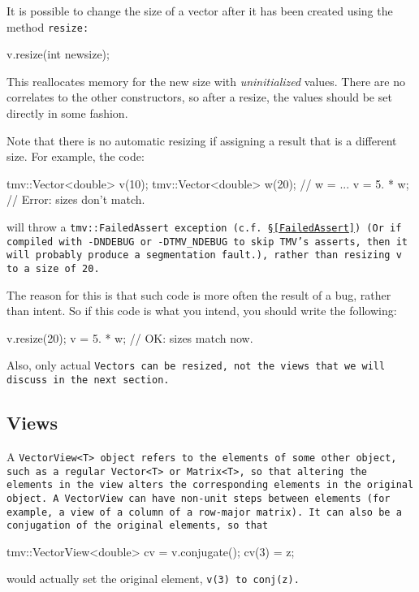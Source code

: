 It is possible to change the size of a vector after it has been created using the method \tt{resize}:

\begin{tmvcode}
v.resize(int newsize);
\end{tmvcode}
This reallocates memory for the new size with {\em uninitialized} values.  
There are no correlates to the other constructors, so after a resize, the 
values should be set directly in some fashion.

Note that there is no automatic resizing if assigning a result that is a different size. 
For example, the code:
\begin{tmvcode}
tmv::Vector<double> v(10);
tmv::Vector<double> w(20);
// w = ...
v = 5. * w;  // Error: sizes don't match.
\end{tmvcode}
will throw a \tt{tmv::FailedAssert} exception (c.f. \S\ref{FailedAssert}) (Or if compiled with 
\tt{-DNDEBUG} or \tt{-DTMV\_NDEBUG} to skip TMV's asserts, then it will probably produce a segmentation fault.),
rather than resizing \tt{v} to a size of 20.  

The reason for this is that such code is more often the result of a bug, rather than intent.
So if this code is what you intend, you should write the following:
\begin{tmvcode}
v.resize(20);
v = 5. * w;  // OK: sizes match now.
\end{tmvcode}

Also, only actual \tt{Vector}s can be resized, not the views that we will discuss in the next section.

\subsection{Views}
\label{Vector_Views}

A \tt{VectorView<T>} object refers to the elements of some other object, such as a regular
\tt{Vector<T>} or \tt{Matrix<T>},
so that altering the elements in the view alters the
corresponding elements in the original object.  A \tt{VectorView}
can have non-unit
steps between elements (for example, a view of a column of a row-major
matrix).  It can also be a conjugation of the original
elements, so that
\begin{tmvcode}
tmv::VectorView<double> cv = v.conjugate();
cv(3) = z;
\end{tmvcode}
would actually set the original element, \tt{v(3)} to \tt{conj(z)}. 

